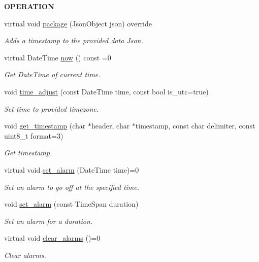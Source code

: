 \begin{Indent}{\bf O\+P\+E\+R\+A\+T\+I\+ON}\par
\begin{DoxyCompactItemize}
\item 
virtual void \hyperlink{class_loom_r_t_c_a13101cb450db89fe15ab77b29dba975e}{package} (Json\+Object json) override
\begin{DoxyCompactList}\small\item\em Adds a timestamp to the provided data Json. \end{DoxyCompactList}\item 
virtual Date\+Time \hyperlink{class_loom_r_t_c_abef017ad813f2f5fd6559af2b64e409b}{now} () const =0
\begin{DoxyCompactList}\small\item\em Get Date\+Time of current time. \end{DoxyCompactList}\item 
void \hyperlink{class_loom_r_t_c_ac25717e8d486c123629973684778348f}{time\+\_\+adjust} (const Date\+Time time, const bool is\+\_\+utc=true)
\begin{DoxyCompactList}\small\item\em Set time to provided timezone. \end{DoxyCompactList}\item 
void \hyperlink{class_loom_r_t_c_a711641fee9d04f0a9be5537950908f6b}{get\+\_\+timestamp} (char $\ast$header, char $\ast$timestamp, const char delimiter, const uint8\+\_\+t format=3)
\begin{DoxyCompactList}\small\item\em Get timestamp. \end{DoxyCompactList}\item 
virtual void \hyperlink{class_loom_r_t_c_a34b7dd8dacbfdb61876cc4aabb79e67e}{set\+\_\+alarm} (Date\+Time time)=0
\begin{DoxyCompactList}\small\item\em Set an alarm to go off at the specified time. \end{DoxyCompactList}\item 
void \hyperlink{class_loom_r_t_c_ac0576fedce58ab95c864b146494343af}{set\+\_\+alarm} (const Time\+Span duration)
\begin{DoxyCompactList}\small\item\em Set an alarm for a duration. \end{DoxyCompactList}\item 
virtual void \hyperlink{class_loom_r_t_c_aac5fd7b736ca4732348ca9c99935bfc6}{clear\+\_\+alarms} ()=0
\begin{DoxyCompactList}\small\item\em Clear alarms. \end{DoxyCompactList}\end{DoxyCompactItemize}
\end{Indent}
